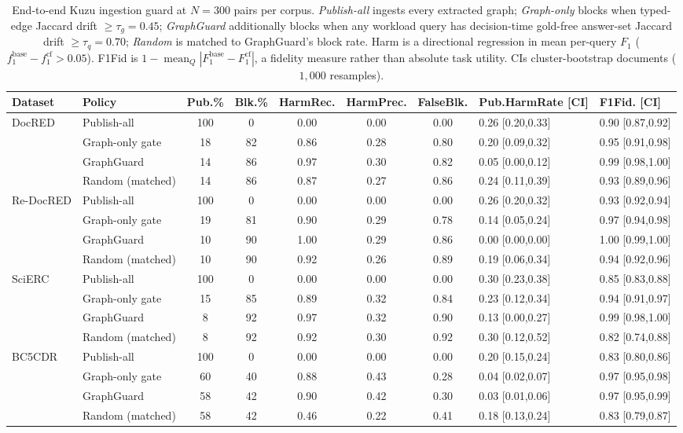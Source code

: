 \begin{table}[t]
\centering\small
\caption{End-to-end Kuzu ingestion guard at $N{=}300$ pairs per corpus. \emph{Publish-all} ingests every extracted graph; \emph{Graph-only} blocks when typed-edge Jaccard drift $\geq\tau_g{=}0.45$; \emph{GraphGuard} additionally blocks when any workload query has decision-time gold-free answer-set Jaccard drift $\geq\tau_q{=}0.70$; \emph{Random} is matched to GraphGuard's block rate. Harm is a directional regression in mean per-query $F_1$ ($f_1^{\mathrm{base}}{-}f_1^{\mathrm{cf}}>0.05$). F1Fid is $1-\operatorname{mean}_Q|F_1^{\mathrm{base}}-F_1^{\mathrm{cf}}|$, a fidelity measure rather than absolute task utility. CIs cluster-bootstrap documents ($1{,}000$ resamples).}
\label{tab:e2ekuzu}
\begin{tabular}{llcccccll}
\toprule
Dataset & Policy & Pub.\% & Blk.\% & HarmRec. & HarmPrec. & FalseBlk. & Pub.HarmRate [CI] & F1Fid. [CI] \\
\midrule
DocRED & Publish-all & 100 & 0 & 0.00 & 0.00 & 0.00 & 0.26 [0.20,0.33] & 0.90 [0.87,0.92] \\
 & Graph-only gate & 18 & 82 & 0.86 & 0.28 & 0.80 & 0.20 [0.09,0.32] & 0.95 [0.91,0.98] \\
 & GraphGuard & 14 & 86 & 0.97 & 0.30 & 0.82 & 0.05 [0.00,0.12] & 0.99 [0.98,1.00] \\
 & Random (matched) & 14 & 86 & 0.87 & 0.27 & 0.86 & 0.24 [0.11,0.39] & 0.93 [0.89,0.96] \\
\midrule
Re-DocRED & Publish-all & 100 & 0 & 0.00 & 0.00 & 0.00 & 0.26 [0.20,0.32] & 0.93 [0.92,0.94] \\
 & Graph-only gate & 19 & 81 & 0.90 & 0.29 & 0.78 & 0.14 [0.05,0.24] & 0.97 [0.94,0.98] \\
 & GraphGuard & 10 & 90 & 1.00 & 0.29 & 0.86 & 0.00 [0.00,0.00] & 1.00 [0.99,1.00] \\
 & Random (matched) & 10 & 90 & 0.92 & 0.26 & 0.89 & 0.19 [0.06,0.34] & 0.94 [0.92,0.96] \\
\midrule
SciERC & Publish-all & 100 & 0 & 0.00 & 0.00 & 0.00 & 0.30 [0.23,0.38] & 0.85 [0.83,0.88] \\
 & Graph-only gate & 15 & 85 & 0.89 & 0.32 & 0.84 & 0.23 [0.12,0.34] & 0.94 [0.91,0.97] \\
 & GraphGuard & 8 & 92 & 0.97 & 0.32 & 0.90 & 0.13 [0.00,0.27] & 0.99 [0.98,1.00] \\
 & Random (matched) & 8 & 92 & 0.92 & 0.30 & 0.92 & 0.30 [0.12,0.52] & 0.82 [0.74,0.88] \\
\midrule
BC5CDR & Publish-all & 100 & 0 & 0.00 & 0.00 & 0.00 & 0.20 [0.15,0.24] & 0.83 [0.80,0.86] \\
 & Graph-only gate & 60 & 40 & 0.88 & 0.43 & 0.28 & 0.04 [0.02,0.07] & 0.97 [0.95,0.98] \\
 & GraphGuard & 58 & 42 & 0.90 & 0.42 & 0.30 & 0.03 [0.01,0.06] & 0.97 [0.95,0.99] \\
 & Random (matched) & 58 & 42 & 0.46 & 0.22 & 0.41 & 0.18 [0.13,0.24] & 0.83 [0.79,0.87] \\
\bottomrule
\end{tabular}
\end{table}

